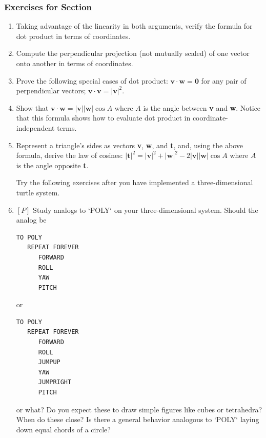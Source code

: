 \documentclass{book}
\begin{document}
\subsubsection{Exercises for Section \thesection}
\begin{enumerate}
\item Taking advantage of the linearity in both arguments, verify the
formula for dot product in terms of coordinates.
\item Compute the perpendicular projection (not mutually scaled) of one
vector onto another in terms of coordinates.  
\item Prove the following special cases of dot product: $\mathbf{v} \cdot \mathbf{w} = \mathbf{0}$ for any
pair of perpendicular vectors; $\mathbf{v} \cdot \mathbf{v} = |\mathbf{v}|^2$.  
\item Show that $\mathbf{v} \cdot \mathbf{w} = |\mathbf{v}||\mathbf{w}| \cos A$ where $A$ is the angle between \textbf{v} and \textbf{w}.
Notice that this formula shows how to evaluate dot product in coordinate-independent terms.  
\item Represent a triangle's sides as vectors \textbf{v}, \textbf{w}, and \textbf{t}, and, using the
above formula, derive the law of cosines:
$|\mathbf{t}|^2 = |\mathbf{v}|^2 + |\mathbf{w}|^2 - 2|\mathbf{v}||\mathbf{w}| \cos A$
where $A$ is the angle opposite \textbf{t}.  

Try the following exercises after you have implemented a three-dimensional turtle system.

\item $[P]$ Study analogs to \textsc{`POLY`} on your three-dimensional system. Should
the analog be

\begin{verbatim}
TO POLY
   REPEAT FOREVER
      FORWARD
      ROLL 
      YAW
      PITCH
\end{verbatim}
or
\begin{verbatim}
TO POLY
   REPEAT FOREVER
      FORWARD
      ROLL
      JUMPUP
      YAW
      JUMPRIGHT
      PITCH
\end{verbatim}
or what? Do you expect these to draw simple figures like cubes or tetrahedra? When do these close? Is there a general behavior analogous to
\textsc{`POLY`} laying down equal chords of a circle?  


\end{enumerate}
\end{document}
